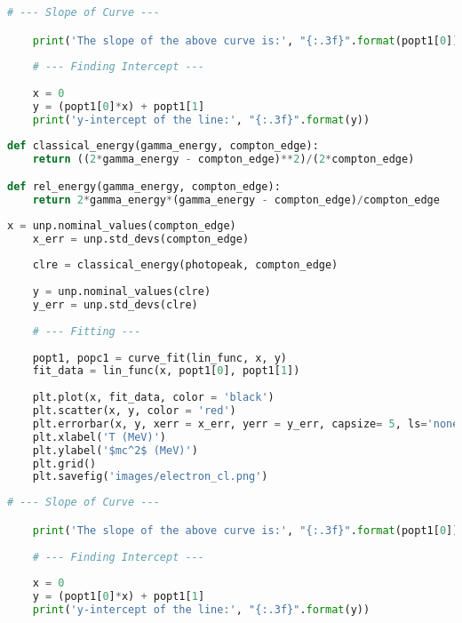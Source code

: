 \begin{lstlisting}[language = Python, frame = single]
    # --- Slope of Curve --- 

    print('The slope of the above curve is:', "{:.3f}".format(popt1[0]))
    
    # --- Finding Intercept --- 
    
    x = 0
    y = (popt1[0]*x) + popt1[1]
    print('y-intercept of the line:', "{:.3f}".format(y))
\end{lstlisting}

\begin{lstlisting}[language = Python, frame = single]
    def classical_energy(gamma_energy, compton_edge):
    return ((2*gamma_energy - compton_edge)**2)/(2*compton_edge)

def rel_energy(gamma_energy, compton_edge): 
    return 2*gamma_energy*(gamma_energy - compton_edge)/compton_edge
\end{lstlisting}

\begin{lstlisting}[language = Python, frame = single]
    x = unp.nominal_values(compton_edge)
    x_err = unp.std_devs(compton_edge)
    
    clre = classical_energy(photopeak, compton_edge)
    
    y = unp.nominal_values(clre)
    y_err = unp.std_devs(clre)
    
    # --- Fitting --- 
    
    popt1, popc1 = curve_fit(lin_func, x, y)
    fit_data = lin_func(x, popt1[0], popt1[1])
    
    plt.plot(x, fit_data, color = 'black')
    plt.scatter(x, y, color = 'red')
    plt.errorbar(x, y, xerr = x_err, yerr = y_err, capsize= 5, ls='none', color = 'red')
    plt.xlabel('T (MeV)')
    plt.ylabel('$mc^2$ (MeV)')
    plt.grid()
    plt.savefig('images/electron_cl.png')
\end{lstlisting}

\begin{lstlisting}[language = Python, frame = single]
    # --- Slope of Curve --- 

    print('The slope of the above curve is:', "{:.3f}".format(popt1[0]))
    
    # --- Finding Intercept --- 
    
    x = 0
    y = (popt1[0]*x) + popt1[1]
    print('y-intercept of the line:', "{:.3f}".format(y))
\end{lstlisting}

